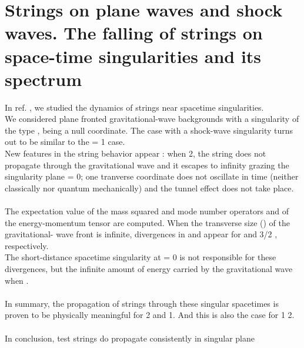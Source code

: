 \documentclass[12pt,a4paper]{article}
\begin{document}
\section{Strings on plane waves and shock waves. The 
falling of strings  on space-time singularities and its spectrum}
In ref. \cite{vs4}, we studied the dynamics of strings near spacetime 
singularities. \\
We considered plane fronted gravitational-wave backgrounds with a singularity 
of the type \coordHE{}, \coordHE{} being a null coordinate. The case with 
a \coordHE{} shock-wave singularity turns out to be similar to the 
\myHighlight{$\beta $}\coordHE{} = 1 case. \\
New features in the string behavior appear : when \myHighlight{$\beta \ge $}\coordHE{} 2, the string 
does not propagate through the gravitational wave and it escapes to 
infinity grazing the singularity plane \coordHE{} = 0; one tranverse coordinate 
does not oscillate in time (neither classically nor quantum mechanically) 
and the tunnel effect does not take place. \\ \\
The expectation value of the mass squared \coordHE{} and mode 
number \coordHE{} operators and of the energy-momentum tensor 
are computed. When the transverse size (\coordHE{}) of the gravitational-
wave front is infinite, divergences in \coordHE{} and 
\coordHE{} appear for \coordHE{} and 3/2 \coordHE{}, 
respectively. \\
The short-distance spacetime singularity at \coordHE{} = 0 is not responsible for 
these divergences, but the infinite amount of energy carried by the 
gravitational wave when \coordHE{}. \\ \\
In summary, the propagation of strings through these singular spacetimes 
is proven to be physically meaningful for \myHighlight{$\beta \ge $}\coordHE{} 2 and \myHighlight{$\beta <$}\coordHE{} 1.  
And this is also the case for 1 \myHighlight{$\le \beta < $}\coordHE{} 2. \\ \\
In conclusion, test strings do propagate consistently in singular plane 
\end{document}
